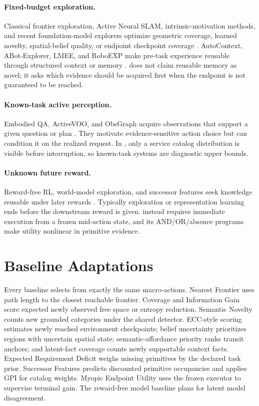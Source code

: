 \paragraph{Fixed-budget exploration.}
Classical frontier exploration, Active Neural SLAM, intrinsic-motivation methods, and recent foundation-model explorers optimize geometric coverage, learned novelty, spatial-belief quality, or endpoint checkpoint coverage
\citep{yamauchi1997frontier,chaplot2020ans,sekar2020plan2explore,ye2026look,zhang2026theory}.
AutoContext, ABot-Explorer, LMEE, and RoboEXP make pre-task experience reusable through structured context or memory
\citep{cai2026autocontext,chen2026abot,wang2026lmee,jiang2024roboexp}.
\taskname{} does not claim reusable memory as novel; it asks which evidence should be acquired first when the endpoint is not guaranteed to be reached.

\paragraph{Known-task active perception.}
Embodied QA, ActiveVOO, and ObsGraph acquire observations that support a given question or plan
\citep{das2018eqa,liu2025activevoo,lee2026obsgraph}.
They motivate evidence-sensitive action choice but can condition it on the realized request.
In \taskname{}, only a service catalog distribution is visible before interruption, so known-task systems are diagnostic upper bounds.

\paragraph{Unknown future reward.}
Reward-free RL, world-model exploration, and successor features seek knowledge reusable under later rewards
\citep{jin2020rewardfree,zhang2021rewardfree,sekar2020plan2explore,barreto2017successor}.
Typically exploration or representation learning ends before the downstream reward is given.
\taskname{} instead requires immediate execution from a frozen mid-action state, and its AND/OR/absence programs make utility nonlinear in primitive evidence.

\section{Baseline Adaptations}
\label{app:baselines}

Every baseline selects from exactly the same macro-actions.
Nearest Frontier uses path length to the closest reachable frontier.
Coverage and Information Gain score expected newly observed free space or entropy reduction.
Semantic Novelty counts new grounded categories under the shared detector.
ECC-style scoring estimates newly reached environment checkpoints; belief uncertainty prioritizes regions with uncertain spatial state; semantic-affordance priority ranks transit anchors; and latent-fact coverage counts newly supportable context facts.
Expected Requirement Deficit weighs missing primitives by the declared task prior.
Successor Features predicts discounted primitive occupancies and applies GPI for catalog weights.
Myopic Endpoint Utility uses the frozen executor to supervise terminal gain.
The reward-free model baseline plans for latent model disagreement.

